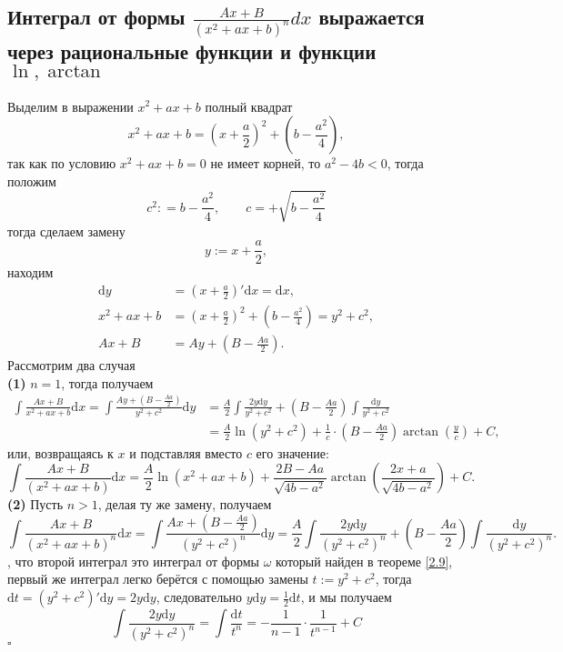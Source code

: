 \documentclass[a4paper]{article}
\newcommand{\qed}{\hfill$\square$}
\begin{document}
\subsection{Интеграл от формы $\frac{Ax+B}{(x^2+ax+b)^n}dx$ выражается через рациональные функции и функции $\ln,\arctan$}
Выделим в выражении $x^2 + ax + b$ полный квадрат
$$
x^2 + ax + b = \left(x+ \frac{a}{2} \right)^2 + \left(b - \frac{a^2}{4} \right),
$$
так как по условию $x^2 + ax + b =0$ не имеет корней, то $a^2 - 4b <0$, тогда положим 
$$
c^2: = b- \frac{a^2}{4}, \qquad c = + \sqrt{b- \frac{a^2}{4}}
$$
тогда сделаем замену 
$$
y:= x+ \frac{a}{2},
$$
находим
$$\begin{aligned}
\mathrm{d}y &= \left( x+ \frac{a}{2}\right)' \mathrm{d}x = \mathrm{d}x,\\
x^2 + ax + b &= \left(x+ \frac{a}{2} \right)^2 + \left(b - \frac{a^2}{4} \right) = y^2 + c^2, \\
Ax + B &=  Ay + \left(B - \frac{Aa}{2} \right).
\end{aligned}$$
Рассмотрим два случая\\[2mm]
\indent\textbf{(1)} $n = 1$, тогда получаем
$$\begin{aligned}
\int \frac{Ax + B}{x^2 + ax + b}\mathrm{d}x = \int \frac{Ay + \left( B - \frac{Aa}{2} \right)}{y^2 + c^2}\mathrm{d}y &= \frac{A}{2} \int \frac{2y\mathrm{d}y}{y^2 + c^2} + \left( B - \frac{Aa}{2} \right) \int \frac{\mathrm{d}y}{y^2 + c^2} \\
&= \frac{A}{2} \ln(y^2 + c^2) + \frac{1}{c} \cdot \left( B - \frac{Aa}{2} \right)\arctan\left(\frac{y}{c}\right) + C,
\end{aligned}$$
или, возвращаясь к $x$ и подставляя вместо $c$ его значение:
$$
\int \frac{Ax + B}{(x^2 + ax + b)}\mathrm{d}x =  \frac{A}{2}\ln(x^2 + ax + b) + \frac{2B-Aa}{\sqrt{4b-a^2}}\arctan\left( \frac{2x+a}{\sqrt{4b-a^2}} \right) + C.
$$
\indent\textbf{(2) }Пусть $n >1$, делая ту же замену, получаем
$$
\int \frac{Ax + B}{(x^2 + ax + b)^n}\mathrm{d}x = \int \frac{Ax + \left( B - \frac{Aa}{2} \right)}{(y^2 + c^2)^n}\mathrm{d}y = \frac{A}{2} \int \frac{2y\mathrm{d}y}{(y^2 + c^2)^n} + \left( B - \frac{Aa}{2} \right) \int \frac{\mathrm{d}y}{(y^2 + c^2)^n}.
$$
, что второй интеграл это интеграл от формы $\omega$ который найден в теореме \ref{2.9}, первый же интеграл легко берётся с помощью замены $t:=y^2 + c^2 $, тогда $\mathrm{d}t = (y^2 + c^2)'\mathrm{d}y = 2y\mathrm{d}y$, следовательно $y\mathrm{d}y = \frac{1}{2}\mathrm{d}t$, и мы получаем
$$
\int \frac{2y\mathrm{d}y}{(y^2 + c^2)^n} = \int \frac{\mathrm{d}t}{t^n} = - \frac{1}{n-1}\cdot \frac{1}{t^{n-1}} +C
$$\qed
\end{document}
